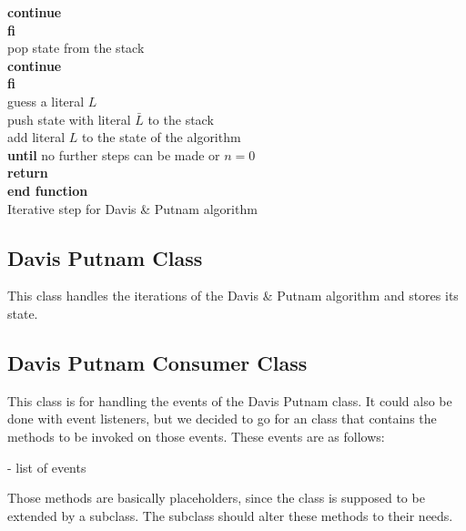 \begin{listing}[h!]
                    \hspace*{2cm} \textbf{continue}\\
                \hspace*{1.5cm} \textbf{fi}\\
                \hspace*{1.5cm} pop state from the stack\\
                \hspace*{1.5cm} \textbf{continue}\\
            \hspace*{1.0cm} \textbf{fi}\\
            \hspace*{1.0cm} guess a literal $L$\\
            \hspace*{1.0cm} push state with literal $\bar{L}$ to the stack\\
            \hspace*{1.0cm} add literal $L$ to the state of the algorithm\\
        \hspace*{0.5cm} \textbf{until} no further steps can be made or $n = 0$\\
        \hspace*{0.5cm} \textbf{return}\\
    \textbf{end function}\\
    \caption{Iterative step for Davis \& Putnam algorithm}
    \label{code:stepDavisPutnam}
\end{listing}  

\subsection{Davis Putnam Class}
\label{sub:impDavisPutnam}
This class handles the iterations of the Davis \& Putnam algorithm and stores its state.



\subsection{Davis Putnam Consumer Class}
\label{sub:impDavisPutnamConsumer}
This class is for handling the events of the Davis Putnam class. It could also be done with event listeners, but we decided to go for an class that contains the methods to be invoked on those events. These events are as follows:

- list of events

Those methods are basically placeholders, since the class is supposed to be extended by a subclass. The subclass should alter these methods to their needs.

